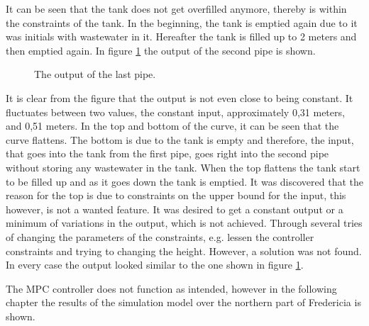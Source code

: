 It can be seen that the tank does not get overfilled anymore, thereby is within the constraints of the tank. In the beginning, the tank is emptied again due to it was initials with wastewater in it. Hereafter the tank is filled up to 2 meters and then emptied again. In figure \ref{fig:MPC_test_output_second_test_with_constraints} the output of the second pipe is shown. 

\begin{figure}[H]
 \centering
 
\caption{The output of the last pipe.}
\label{fig:MPC_test_output_second_test_with_constraints}
\end{figure}

It is clear from the figure that the output is not even close to being constant. It fluctuates between two values, the constant input, approximately 0,31 meters, and 0,51 meters. In the top and bottom of the curve, it can be seen that the curve flattens. The bottom is due to the tank is empty and therefore, the input, that goes into the tank from the first pipe, goes right into the second pipe without storing any wastewater in the tank. When the top flattens the tank start to be filled up and as it goes down the tank is emptied. It was discovered that the reason for the top is due to constraints on the upper bound for the input, this however, is not a wanted feature. It was desired to get a constant output or a minimum of variations in the output, which is not achieved. Through several tries of changing the parameters of the constraints, e.g. lessen the controller constraints and trying to changing the height. However, a solution was not found. In every case the output looked similar to the one shown in figure \ref{fig:MPC_test_output_second_test_with_constraints}.

The MPC controller does not function as intended, however in the following chapter the results of the simulation model over the northern part of Fredericia is shown.







